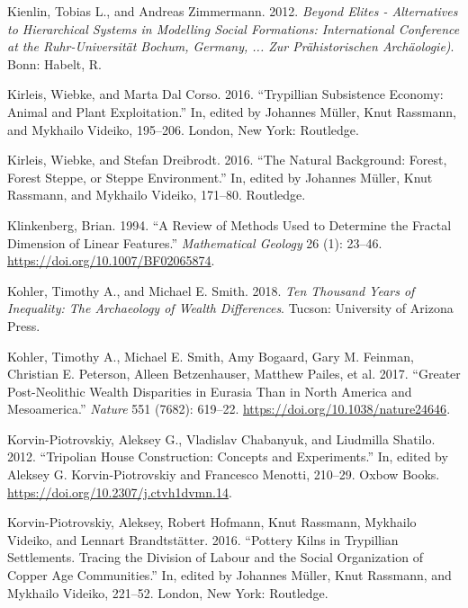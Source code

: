 \documentclass[
  12pt,
  a4paper, twoside]{book}
\newlength{\cslhangindent}
\newlength{\cslentryspacingunit} %
\newenvironment{CSLReferences}[2] %
 {%
  \setlength{\parindent}{0pt}
  \ifodd #1
  \let\oldpar\par
  \def\par{\hangindent=\cslhangindent\oldpar}
  \fi
  \setlength{\parskip}{#2\cslentryspacingunit}
 }%
 {}
\begin{document}
\begin{CSLReferences}{1}{0}
\leavevmode{}%
Kienlin, Tobias L., and Andreas Zimmermann. 2012. \emph{Beyond Elites - Alternatives to Hierarchical Systems in Modelling Social Formations: International Conference at the Ruhr-Universität Bochum, Germany, ... Zur Prähistorischen Archäologie)}. Bonn: Habelt, R.

\leavevmode{}%
Kirleis, Wiebke, and Marta Dal Corso. 2016. {``Trypillian Subsistence Economy: Animal and Plant Exploitation.''} In, edited by Johannes Müller, Knut Rassmann, and Mykhailo Videiko, 195--206. London, New York: Routledge.

\leavevmode{}%
Kirleis, Wiebke, and Stefan Dreibrodt. 2016. {``The Natural Background: Forest, Forest Steppe, or Steppe Environment.''} In, edited by Johannes Müller, Knut Rassmann, and Mykhailo Videiko, 171--80. Routledge.

\leavevmode{}%
Klinkenberg, Brian. 1994. {``A Review of Methods Used to Determine the Fractal Dimension of Linear Features.''} \emph{Mathematical Geology} 26 (1): 23--46. \url{https://doi.org/10.1007/BF02065874}.

\leavevmode{}%
Kohler, Timothy A., and Michael E. Smith. 2018. \emph{Ten Thousand Years of Inequality: The Archaeology of Wealth Differences}. Tucson: University of Arizona Press.

\leavevmode{}%
Kohler, Timothy A., Michael E. Smith, Amy Bogaard, Gary M. Feinman, Christian E. Peterson, Alleen Betzenhauser, Matthew Pailes, et al. 2017. {``Greater Post-Neolithic Wealth Disparities in Eurasia Than in North America and Mesoamerica.''} \emph{Nature} 551 (7682): 619--22. \url{https://doi.org/10.1038/nature24646}.

\leavevmode{}%
Korvin-Piotrovskiy, Aleksey G., Vladislav Chabanyuk, and Liudmilla Shatilo. 2012. {``Tripolian House Construction: Concepts and Experiments.''} In, edited by Aleksey G. Korvin-Piotrovskiy and Francesco Menotti, 210--29. Oxbow Books. \url{https://doi.org/10.2307/j.ctvh1dvmn.14}.

\leavevmode{}%
Korvin-Piotrovskiy, Aleksey, Robert Hofmann, Knut Rassmann, Mykhailo Videiko, and Lennart Brandtstätter. 2016. {``Pottery Kilns in Trypillian Settlements. Tracing the Division of Labour and the Social Organization of Copper Age Communities.''} In, edited by Johannes Müller, Knut Rassmann, and Mykhailo Videiko, 221--52. London, New York: Routledge.


\end{CSLReferences}
\end{document}
